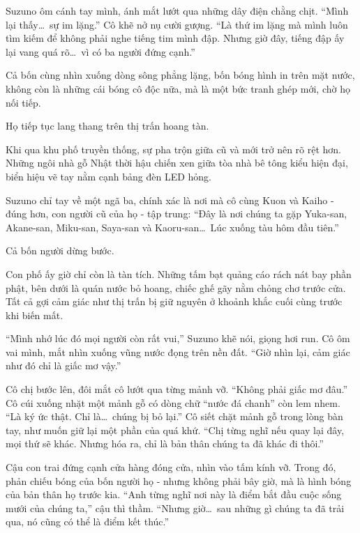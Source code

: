 \documentclass[../main.tex]{subfiles}
\begin{document}
Suzuno ôm cánh tay mình, ánh mắt lướt qua những dây điện chằng chịt. ``Mình lại thấy\dots\ sự im lặng.'' Cô khẽ nở nụ cười gượng. ``Là thứ im lặng mà mình luôn tìm kiếm để không phải nghe tiếng tim mình đập. Nhưng giờ đây, tiếng đập ấy lại vang quá rõ\dots\ vì có ba người đứng cạnh.''

Cả bốn cùng nhìn xuống dòng sông phẳng lặng, bốn bóng hình in trên mặt nước, không còn là những cái bóng cô độc nữa, mà là một bức tranh ghép mới, chờ họ nối tiếp.

\ct

Họ tiếp tục lang thang trên thị trấn hoang tàn.

Khi qua khu phố truyền thống, sự pha trộn giữa cũ và mới trở nên rõ rệt hơn. Những ngôi nhà gỗ Nhật thời hậu chiến xen giữa tòa nhà bê tông kiểu hiện đại, biển hiệu vẽ tay nằm cạnh bảng đèn LED hỏng.


Suzuno chỉ tay về một ngã ba, chính xác là nơi mà cô cùng Kuon và Kaiho - đúng hơn, con người cũ của họ - tập trung: ``Đây là nơi chúng ta gặp Yuka-san, Akane-san, Miku-san, Saya-san và Kaoru-san\dots\ Lúc xuống tàu hôm đầu tiên.''

Cả bốn người dừng bước.

Con phố ấy giờ chỉ còn là tàn tích. Những tấm bạt quảng cáo rách nát bay phần phật, bên dưới là quán nước bỏ hoang, chiếc ghế gãy nằm chỏng chơ trước cửa. Tất cả gợi cảm giác như thị trấn bị giữ nguyên ở khoảnh khắc cuối cùng trước khi biến mất.

``Mình nhớ lúc đó mọi người còn rất vui,'' Suzuno khẽ nói, giọng hơi run. Cô ôm vai mình, mắt nhìn xuống vũng nước đọng trên nền đất. ``Giờ nhìn lại, cảm giác như đó chỉ là giấc mơ vậy.''

Cô chị bước lên, đôi mắt cô lướt qua từng mảnh vỡ. ``Không phải giấc mơ đâu.'' Cô cúi xuống nhặt một mảnh gỗ có dòng chữ ``nước đá chanh'' còn lem nhem. ``Là ký ức thật. Chỉ là\dots\ chúng bị bỏ lại.'' Cô siết chặt mảnh gỗ trong lòng bàn tay, như muốn giữ lại một phần của quá khứ. ``Chị từng nghĩ nếu quay lại đây, mọi thứ sẽ khác. Nhưng hóa ra, chỉ là bản thân chúng ta đã khác đi thôi.''

Cậu con trai đứng cạnh cửa hàng đóng cửa, nhìn vào tấm kính vỡ. Trong đó, phản chiếu bóng của bốn người họ - nhưng không phải bây giờ, mà là hình bóng của bản thân họ trước kia. ``Anh từng nghĩ nơi này là điểm bắt đầu cuộc sống mưới của chúng ta,'' cậu thì thầm. ``Nhưng giờ\dots\ sau những gì chúng ta đã trải qua, nó cũng có thể là điểm kết thúc.''
\end{document}
